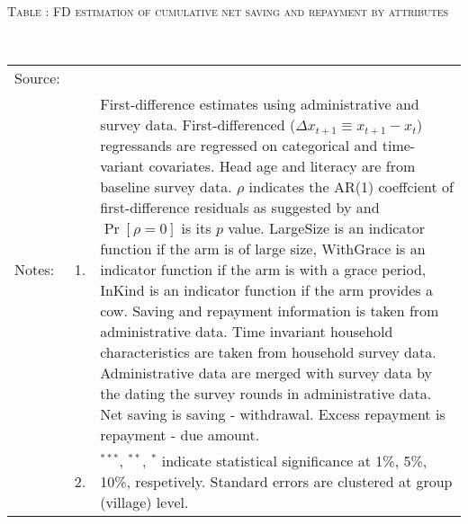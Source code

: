 \hspace{-1cm}\begin{minipage}[t]{14cm}
\hfil\textsc{\normalsize Table \thetable: FD estimation of cumulative net saving and repayment by attributes\label{tab FD saving attributes original HH}}\\
\setlength{\tabcolsep}{1pt}
\setlength{\baselineskip}{8pt}
\renewcommand{\arraystretch}{.55}
\hspace{-.75cm}\\
\renewcommand{\arraystretch}{.8}
\setlength{\tabcolsep}{1pt}
\begin{tabular}{>{\hfill\scriptsize}p{1cm}<{}>{\hfill\scriptsize}p{.25cm}<{}>{\scriptsize}p{12cm}<{\hfill}}
Source:& \multicolumn{2}{l}{\scriptsize Estimated with GUK administrative and survey data.}\\
Notes: & 1. & First-difference estimates using administrative and survey data. First-differenced ($\Delta x_{t+1}\equiv x_{t+1} - x_{t}$) regressands are regressed on categorical and time-variant covariates. Head age and literacy are from baseline survey data. $\rho$ indicates the AR(1) coeffcient of first-difference residuals as suggested by \citet[][10.71]{Wooldridge2010} and $\Pr[\rho=0]$ is its $p$ value. \textsf{LargeSize} is an indicator function if the arm is of large size, \textsf{WithGrace} is an indicator function if the arm is with a grace period, \textsf{InKind} is an indicator function if the arm provides a cow. Saving and repayment information is taken from administrative data. Time invariant household characteristics are taken from household survey data. Administrative data are merged with survey data by the dating the survey rounds in administrative data. Net saving is saving - withdrawal. Excess repayment is repayment - due amount.\\
& 2. & ${}^{***}$, ${}^{**}$, ${}^{*}$ indicate statistical significance at 1\%, 5\%, 10\%, respetively. Standard errors are clustered at group (village) level.
\end{tabular}
\end{minipage}

